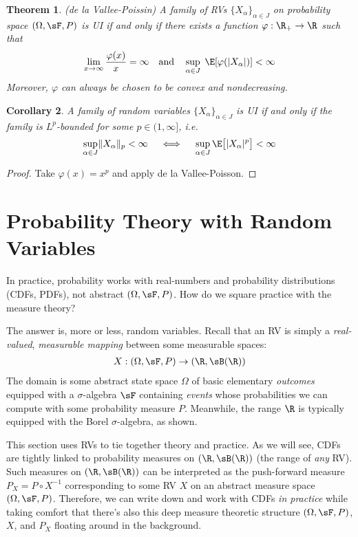 \documentclass[12pt]{article}
\theoremstyle{plain}
\newtheorem{thm}{Theorem}[section]
\newtheorem{cor}[thm]{Corollary}
\theoremstyle{definition}
\theoremstyle{remark}
\newcommand{\ra}{\rightarrow}
\begin{document}
\begin{thm}\emph{(de la Vallee-Poissin)}
A family of RVs $\{X_\alpha\}_{\alpha\in J}$ on probability space
$(\Omega,\sF,P)$ is UI if and only if there exists a function
$\varphi:\R_+\ra\R$ such that
\begin{align*}
  \lim_{x\ra\infty}
  \frac{\varphi(x)}{x} = \infty
  \quad\text{and}\quad
  \sup_{\alpha\in J} \; \E[\varphi(|X_\alpha|)]<\infty
\end{align*}
Moreover, $\varphi$ can always be chosen to be convex and nondecreasing.
\end{thm}

\begin{cor}
A family of random variables $\{X_\alpha\}_{\alpha\in J}$ is UI if and
only if the family is $L^p$-bounded for some $p\in(1,\infty]$, i.e.
\begin{align*}
  \sup_{\alpha\in J}
  \lVert X_\alpha \rVert_p
  <\infty
  \quad\iff\quad
  \sup_{\alpha\in J}
  \E\big[|X_\alpha|^p\big]
  <\infty
\end{align*}
\end{cor}
\begin{proof}
Take $\varphi(x)=x^p$ and apply de la Vallee-Poisson.
\end{proof}


\clearpage
\section{Probability Theory with Random Variables}

In practice, probability works with real-numbers and probability
distributions (CDFs, PDFs), not abstract $(\Omega,\sF,P)$.
How do we square practice with the measure theory?

The answer is, more or less, random variables.
Recall that an RV is simply a \emph{real-valued},
\emph{measurable mapping} between some measurable spaces:
\begin{align*}
  X:(\Omega,\sF,P)\ra (\R,\sB(\R))
\end{align*}
The domain is some abstract state space $\Omega$ of basic elementary
\emph{outcomes} equipped with a $\sigma$-algebra $\sF$ containing
\emph{events} whose probabilities we can compute with some
probability measure $P$.
Meanwhile, the range $\R$ is typically equipped with the Borel
$\sigma$-algebra, as shown.

This section uses RVs to tie together theory and practice.
As we will see, CDFs are tightly linked to probability measures on
$(\R,\sB(\R))$ (the range of \emph{any} RV). Such measures on
$(\R,\sB(\R))$ can be interpreted as the push-forward measure
$P_X=P\circ X^{-1}$ corresponding to some RV $X$ on an abstract measure
space $(\Omega,\sF,P)$.
Therefore, we can write down and work with CDFs \emph{in practice}
while taking comfort that there's also this deep measure theoretic
structure $(\Omega,\sF,P)$, $X$, and $P_X$ floating around in the
background.
\end{document}
